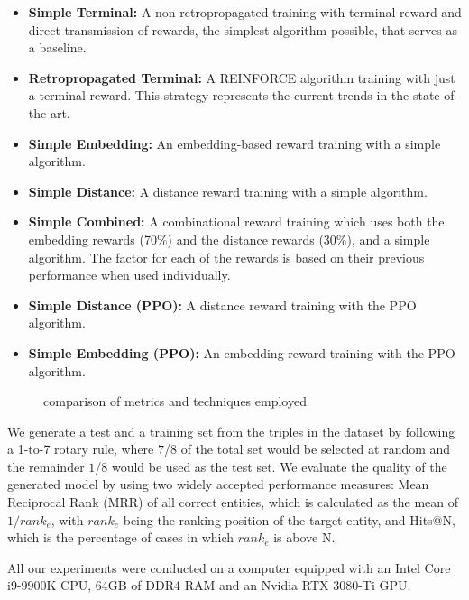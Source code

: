\begin{itemize}
    \item\textbf{Simple Terminal:} A non-retropropagated training with terminal reward and direct transmission of rewards, the simplest algorithm possible, that serves as a baseline.
    \item\textbf{Retropropagated Terminal:} A REINFORCE algorithm training with just a terminal reward. This strategy represents the current trends in the state-of-the-art.
    \item\textbf{Simple Embedding:} An embedding-based reward training with a simple algorithm.
    \item\textbf{Simple Distance:} A distance reward training with a simple algorithm.
    \item\textbf{Simple Combined:} A combinational reward training which uses both the embedding rewards (70\%) and the distance rewards (30\%), and a simple algorithm. The factor for each of the rewards is based on their previous performance when used individually.
    \item\textbf{Simple Distance (PPO):} A distance reward training with the PPO algorithm.
    \item\textbf{Simple Embedding (PPO):} An embedding reward training with the PPO algorithm.
\end{itemize}

\begin{figure}[!h]
    \centering
    
    \caption{comparison of metrics and techniques employed}
    \label{fig:metricsbarchart}
\end{figure}

We generate a test and a training set from the triples in the dataset by following a 1-to-7 rotary rule, where $7$/$8$ of the total set would be selected at random and the remainder $1$/$8$ would be used as the test set. We evaluate the quality of the generated model by using two widely accepted performance measures: Mean Reciprocal Rank (MRR) of all correct entities, which is calculated as the mean of $1/rank_{e}$, with $rank_{e}$ being the ranking position of the target entity, and Hits@N, which is the percentage of cases in which $rank_{e}$ is above N. 



All our experiments were conducted on a computer equipped with an Intel Core i9-9900K CPU, 64GB of DDR4 RAM and an Nvidia RTX 3080-Ti GPU.


